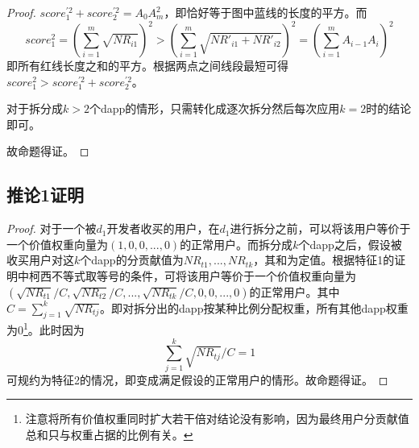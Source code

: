 \begin{proof}
	 $score_1^{'2}+score_2^{'2}=A_0A_m^2$，即恰好等于图中蓝线的长度的平方。而
	 $$score_1^2 = (\sum_{i=1}^m \sqrt{NR_{i1}})^2 > (\sum_{i=1}^m \sqrt{NR'_{i1}+NR'_{i2}})^2 = (\sum_{i=1}^m A_{i-1}A_i)^2$$
	 即所有红线长度之和的平方。根据两点之间线段最短可得$score_1^2 >score_1^{'2}+score_2^{'2}$。
	 
	 对于拆分成$k>2$个dapp的情形，只需转化成逐次拆分然后每次应用$k=2$时的结论即可。
	 
	 故命题得证。
\end{proof}

\subsection{推论1证明}
\begin{proof}
	对于一个被$d_1$开发者收买的用户，在$d_1$进行拆分之前，可以将该用户等价于一个价值权重向量为$(1,0,0,...,0)$的正常用户。而拆分成$k$个dapp之后，假设被收买用户对这$k$个dapp的分贡献值为$NR_{t1},...,NR_{tk}$，其和为定值。根据特征1的证明中柯西不等式取等号的条件，可将该用户等价于一个价值权重向量为$(\sqrt{NR_{t1}}/C,\sqrt{NR_{t2}}/C,...,\sqrt{NR_{tk}}/C,0,0,...,0)$的正常用户。其中$C=\sum_{j=1}^k \sqrt{NR_{tj}}$。即对拆分出的dapp按某种比例分配权重，所有其他dapp权重为0\footnote{注意将所有价值权重同时扩大若干倍对结论没有影响，因为最终用户分贡献值总和只与权重占据的比例有关。}。此时因为
	$$\sum_{j=1}^k \sqrt{NR_{tj}}/C =1$$
	可规约为特征2的情况，即变成满足假设的正常用户的情形。故命题得证。
\end{proof}